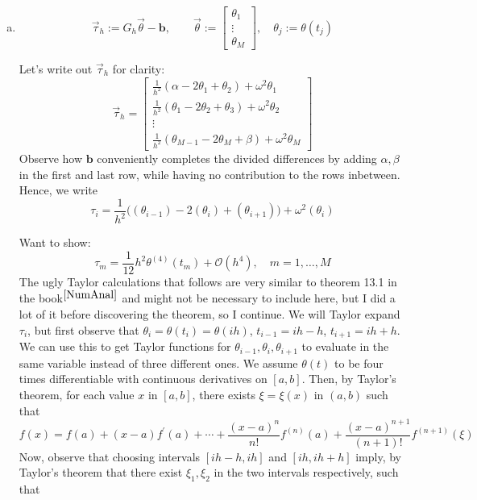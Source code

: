 \begin{enumerate}[a)]
  \item
$$
\vec{\tau}_{h}:=G_{h} \vec{\theta}-\mathbf{b}, \qquad
\vec{\theta}:=\left[\begin{array}{c}
\theta_{1} \\
\vdots \\
\theta_{M}
\end{array}\right], \quad \theta_{j}:=\theta\left(t_{j}\right)
$$

Let's write out $\vec{\tau}_{h}$ for clarity:
\begin{equation}
  \vec{\tau}_{h} =
    \begin{bmatrix}
      \frac{1}{h^2}\left(\alpha - 2\theta_1 + \theta_2 \right) + \omega^2\theta_1 \\
      \frac{1}{h^2}\left(\theta_1 - 2\theta_2 + \theta_3\right) + \omega^2\theta_2 \\
      \vdots \\
      \frac{1}{h^2}\left(\theta_{M-1} - 2\theta_{M} + \beta\right) + \omega^2\theta_M
    \end{bmatrix}
\end{equation}
Observe how $\mathbf{b}$ conveniently completes the divided differences by adding $\alpha , \beta$ in the first and last row, while having no contribution to the rows inbetween. Hence, we write
  \begin{equation}\label{taui2}
    \tau_i =
    \frac{1}{h^2}\bigg(\left(\theta_{i-1}\right)-2\left(\theta_{i}\right)+ \left(\theta_{i+1}\right)  \bigg) + \omega^2\left(\theta_{i}\right)
  \end{equation}

Want to show:
  $$
\tau_{m}=\frac{1}{12} h^{2} \theta^{(4)}\left(t_{m}\right)+\mathcal{O}\left(h^{4}\right), \quad m=1, \ldots, M
  $$
The ugly Taylor calculations that follows are very similar to theorem 13.1 in the book$^{\ref{NumAnal}}$ and might not be necessary to include here, but I did a lot of it before discovering the theorem, so I continue.
\newline We will Taylor expand $\tau_i$, but first observe that $\theta_i=\theta(t_i)=\theta(ih)$, $t_{i-1}=ih-h$, $t_{i+1}=ih+h$. We can use this to get Taylor functions for $\theta_{i-1}, \theta_i, \theta_{i+1}$ to evaluate in the same variable instead of three different ones.
\newline We assume $\theta(t)$ to be four times differentiable with continuous derivatives on $[a,b]$. Then, by Taylor's theorem, for each value $x$ in $[a,b]$, there exists $\xi=\xi(x)$ in $(a,b)$ such that
  $$
f(x)=f(a)+(x-a) f^{\prime}(a)+\cdots+\frac{(x-a)^{n}}{n !} f^{(n)}(a)+\frac{(x-a)^{n+1}}{(n+1) !} f^{(n+1)}(\xi)
  $$
Now, observe that choosing intervals $[ih-h, ih]$ and $[ih, ih+h]$ imply, by Taylor's theorem that there exist $\xi_1, \xi_2$ in the two intervals respectively, such that


\end{enumerate}
